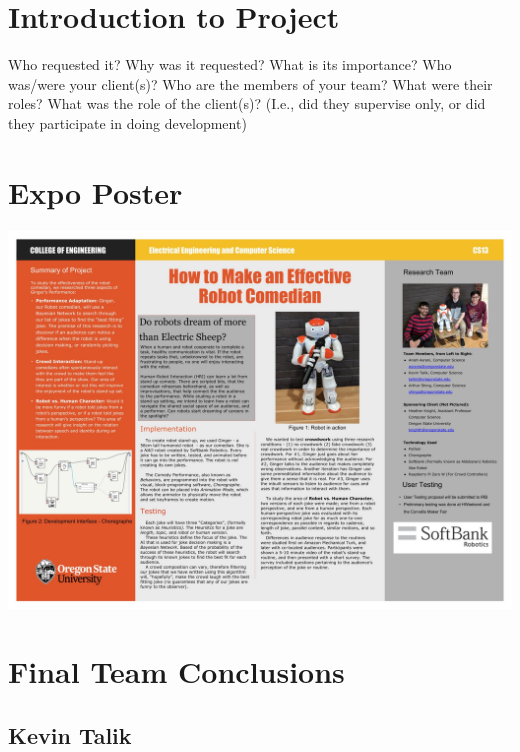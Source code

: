 \documentclass[onecolumn, draftclsnofoot,10pt, compsoc]{IEEEtran}
\begin{document}
\section{Introduction to Project}
Who requested it?
Why was it requested?
What is its importance?
Who was/were your client(s)?
Who are the members of your team?
What were their roles?
What was the role of the client(s)? (I.e., did they supervise only, or did they participate in doing development)















\section{Expo Poster}
\includegraphics[width=\paperwidth, angle=90]{poster.jpg}
\pagebreak

        

\pagebreak
\section{Final Team Conclusions}
\subsection{Kevin Talik}
\end{document}
